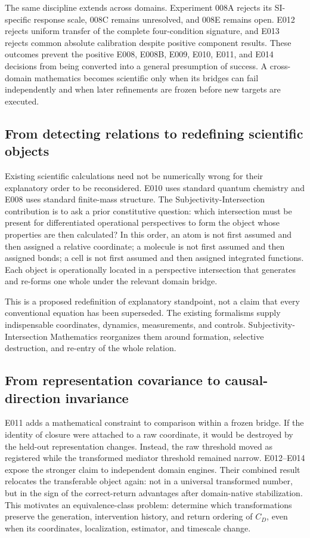 \documentclass[11pt,a4paper]{article}
\begin{document}
The same discipline extends across domains. Experiment 008A rejects its SI-specific response scale, 008C remains unresolved, and 008E remains open. E012 rejects uniform transfer of the complete four-condition signature, and E013 rejects common absolute calibration despite positive component results. These outcomes prevent the positive E008, E008B, E009, E010, E011, and E014 decisions from being converted into a general presumption of success. A cross-domain mathematics becomes scientific only when its bridges can fail independently and when later refinements are frozen before new targets are executed.

\subsection{From detecting relations to redefining scientific objects}

Existing scientific calculations need not be numerically wrong for their explanatory order to be reconsidered. E010 uses standard quantum chemistry and E008 uses standard finite-mass structure. The Subjectivity-Intersection contribution is to ask a prior constitutive question: which intersection must be present for differentiated operational perspectives to form the object whose properties are then calculated? In this order, an atom is not first assumed and then assigned a relative coordinate; a molecule is not first assumed and then assigned bonds; a cell is not first assumed and then assigned integrated functions. Each object is operationally located in a perspective intersection that generates and re-forms one whole under the relevant domain bridge.

This is a proposed redefinition of explanatory standpoint, not a claim that every conventional equation has been superseded. The existing formalisms supply indispensable coordinates, dynamics, measurements, and controls. Subjectivity-Intersection Mathematics reorganizes them around formation, selective destruction, and re-entry of the whole relation.

\subsection{From representation covariance to causal-direction invariance}

E011 adds a mathematical constraint to comparison within a frozen bridge. If the identity of closure were attached to a raw coordinate, it would be destroyed by the held-out representation changes. Instead, the raw threshold moved as registered while the transformed mediator threshold remained narrow. E012--E014 expose the stronger claim to independent domain engines. Their combined result relocates the transferable object again: not in a universal transformed number, but in the sign of the correct-return advantages after domain-native stabilization. This motivates an equivalence-class problem: determine which transformations preserve the generation, intervention history, and return ordering of $C_D$, even when its coordinates, localization, estimator, and timescale change.
\end{document}
